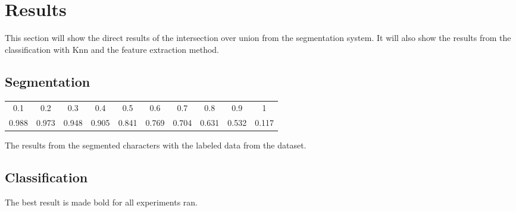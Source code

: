 \newpage
\section{Results} %
\label{sec:results}

This section will show the direct results of the intersection over union from the segmentation system. It will also show the results from the classification with Knn and the feature extraction method.

\subsection{Segmentation}

\begin{minipage}{\linewidth}
\flushleft
{} \label{tab:results:iou} 
\begin{tabular}{ c c c c c c c c c c}
\hline
\hline
0.1		&	0.2		&	0.3		&	0.4		&	0.5		&	0.6		&	0.7		&	0.8		&	0.9		&	1		\\
0.988	&	0.973	&	0.948	&	0.905	&	0.841	&	0.769	&	0.704	&	0.631	&	0.532	&	0.117	\\
\hline
\end{tabular}\par
\bigskip
The results from the segmented characters with the labeled data from the dataset.
\end{minipage}

\subsection{Classification}

The best result is made bold for all experiments ran.

